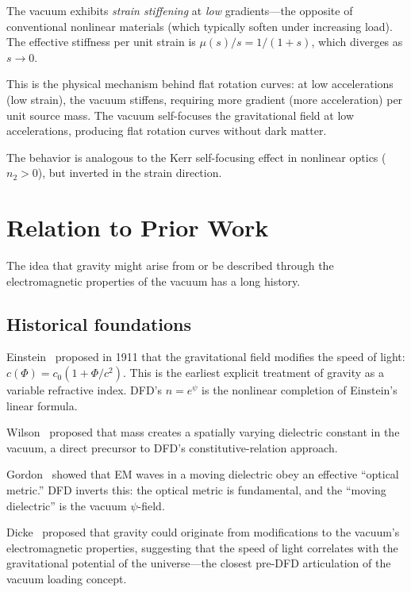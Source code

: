 \documentclass[aps,prd,twocolumn,superscriptaddress,nofootinbib]{revtex4-2}
\begin{document}
The vacuum exhibits \emph{strain stiffening} at \emph{low}
gradients---the opposite of conventional nonlinear materials (which
typically soften under increasing load).  The effective stiffness per
unit strain is $\mu(s)/s = 1/(1+s)$, which diverges as $s \to 0$.

This is the physical mechanism behind flat rotation curves: at low
accelerations (low strain), the vacuum stiffens, requiring more
gradient (more acceleration) per unit source mass.  The vacuum
self-focuses the gravitational field at low accelerations, producing
flat rotation curves without dark matter.

The behavior is analogous to the Kerr self-focusing effect in
nonlinear optics ($n_2 > 0$), but inverted in the strain direction.


\section{Relation to Prior Work}
\label{sec:prior-work}

The idea that gravity might arise from or be described through the
electromagnetic properties of the vacuum has a long history.

\subsection{Historical foundations}

Einstein~\cite{Einstein1911} proposed in 1911 that the gravitational
field modifies the speed of light:
$c(\Phi) = c_0(1 + \Phi/c^2)$.  This is the earliest explicit
treatment of gravity as a variable refractive index.  DFD's
$n = e^\psi$ is the nonlinear completion of Einstein's linear formula.

Wilson~\cite{Wilson1921} proposed that mass creates a spatially
varying dielectric constant in the vacuum, a direct precursor to
DFD's constitutive-relation approach.

Gordon~\cite{Gordon1923} showed that EM waves in a moving dielectric
obey an effective ``optical metric.''  DFD inverts this: the optical
metric is fundamental, and the ``moving dielectric'' is the vacuum
$\psi$-field.

Dicke~\cite{Dicke1957} proposed that gravity could originate from
modifications to the vacuum's electromagnetic properties, suggesting
that the speed of light correlates with the gravitational potential of
the universe---the closest pre-DFD articulation of the vacuum loading
concept.
\end{document}
